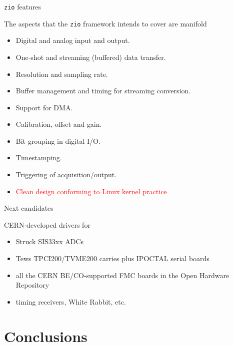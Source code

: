 \documentclass[compress,red]{beamer}
\begin{document}
\begin{frame}{\texttt{zio} features}

The aspects that the \texttt{zio} framework intends to cover are
manifold
\begin{itemize} \small
\pause\item Digital and analog input and output.
\pause\item One-shot and streaming (buffered) data transfer.
\pause\item Resolution and sampling rate.
\pause\item Buffer management and timing for streaming conversion.
\pause\item Support for DMA.
\pause\item Calibration, offset and gain.
\pause\item Bit grouping in digital I/O.
\pause\item Timestamping.
\pause\item Triggering of acquisition/output.
\pause\item \textcolor{red}{Clean design conforming to Linux kernel practice}
\end{itemize}
\end{frame}

\begin{frame}{Next candidates}

CERN-developed drivers for
\begin{itemize}
\pause
\item Struck SIS33xx ADCs
\pause
\item Tews TPCI200/TVME200 carries plus IPOCTAL serial boards
\pause
\item all the CERN BE/CO-supported FMC boards in the Open Hardware Repository
\pause
\item timing receivers, White Rabbit, etc.
\end{itemize}
\end{frame}

\section{Conclusions}
\end{document}
